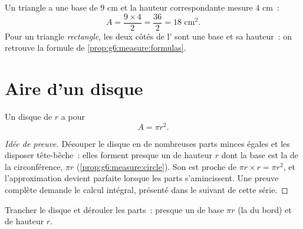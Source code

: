 \begin{example}\label{ex:g7:areas:triangle}
Un triangle a une base de $9$ cm et la hauteur correspondante mesure
$4$ cm~:
\[
A = \frac{9 \times 4}{2} = \frac{36}{2} = 18 \text{ cm}^2 .
\]
Pour un triangle \emph{rectangle}, les deux côtés de l'
sont une base et sa hauteur~: on retrouve la formule de
\cref{prop:g6:measure:formulas}.
\end{example}

\section{Aire d'un disque}

\begin{theorem}[Disque]\label{thm:g7:areas:disk}
Un disque de  $r$ a pour 
\[
A = \pi r^2 .
\]
\end{theorem}

\begin{proof}[Idée de preuve]
Découper le disque en de nombreuses parts minces égales et les
disposer tête-bêche~: elles forment presque un  de
hauteur $r$ dont la base est la  de la circonférence, $\pi r$
(\cref{prop:g6:measure:circle}). Son  est proche de
$\pi r \times r = \pi r^2$, et l'approximation devient parfaite
lorsque les parts s'amincissent. Une preuve complète demande le calcul
intégral, présenté dans le  suivant de cette série.
\end{proof}

\begin{omfigure}

{\small Trancher le disque et dérouler les parts~: presque un
 de base $\pi r$ (la  du bord) et de hauteur
$r$.}
\end{omfigure}

